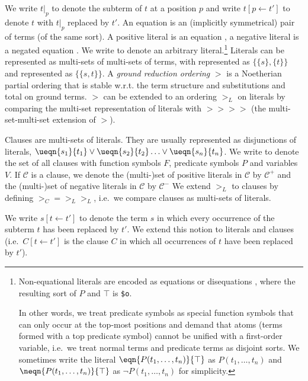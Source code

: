 \documentclass{report}
\begin{document}
We write $t|_p$ to denote the subterm of $t$ at a
position $p$ and write $t[p\leftarrow t']$ to denote $t$ with $t|_p$
replaced by $t'$. An equation  is an
(implicitly symmetrical) pair of terms (of the same sort). A positive
literal is an equation , a negative literal
is a negated equation .  We write  to denote an
arbitrary literal.\footnote{Non-equational literals are encoded as
  equations or disequations , where
  the resulting sort of $P$ and $\top$ is \texttt{\$o}.

  In other words, we treat predicate symbols as special function
  symbols that can only occur at the top-most positions and demand
  that atoms (terms formed with a top predicate symbol) cannot be
  unified with a first-order variable, i.e.\ we treat normal terms and
  predicate terms as disjoint sorts. We sometimes write the literal
  $\eqn{P(t_1, \ldots, t_n)}{\top}$ as $P(t_1, \ldots, t_n)$ and
  $\neqn{P(t_1, \ldots, t_n)}{\top}$ as $\neg P(t_1, \ldots, t_n)$ for
  simplicity.} Literals can be represented as multi-sets of multi-sets
of terms, with  represented as $\{\{s\},\{t\}\}$ and
 represented as $\{\{s, t\}\}$.  A \emph{ground reduction
  ordering} $>$ is a
Noetherian partial ordering that is stable w.r.t. the term structure
and substitutions and total on ground terms. $>$ can be extended to an
ordering $>_L$ on literals by comparing the multi-set representation
of literals with $>\!\!> >\!\!>$ (the multi-set-multi-set extension of
$>$).

Clauses are multi-sets of literals. They are usually represented as
disjunctions of literals, $\ueqn{s_1}{t_1} \vee \ueqn{s_2}{t_2} \ldots
\vee \ueqn{s_n}{t_n}$. We write  to denote the set
of all clauses with function symbols $F$, predicate symbols $P$ and
variables $V$. If $\mathcal{C}$ is a clause, we denote the (multi-)set
of positive literals in $\mathcal{C}$ by $\mathcal{C^+}$ and the
(multi-)set of negative literals in $\mathcal{C}$ by $\mathcal{C^-}$
We extend $>_L$ to clauses by defining $>_C = >_L>_L$, i.e.\ we
compare clauses as multi-sets of literals.

We write $s[t\leftarrow t']$ to denote the term $s$ in which every
occurrence of the subterm $t$ has been replaced by $t'$. We extend this
notion to literals and clauses (i.e.\ $C[t\leftarrow t']$ is the
clause $C$ in which all occurrences of $t$ have been replaced by
$t'$).
\end{document}
